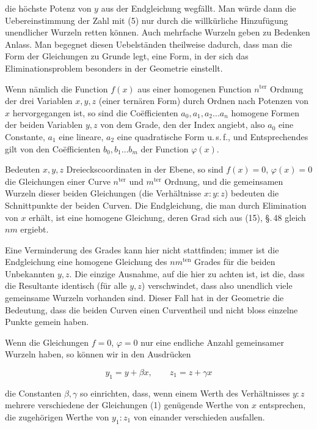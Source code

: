 die höchste Potenz von $y$ aus der Endgleichung wegfällt. Man
würde dann die Uebereinstimmung der Zahl mit (5) nur durch
die willkürliche Hinzufügung unendlicher Wurzeln retten können.
Auch mehrfache Wurzeln geben zu Bedenken Anlass. Man begegnet diesen Uebelständen theilweise dadurch, dass man die
 Form der Gleichungen zu Grunde legt, eine Form,
in der sich das Eliminationsproblem besonders in der Geometrie
einstellt.

Wenn nämlich die Function $f(x)$ aus einer homogenen
Function $n^{\mathrm{ter}}$ Ordnung der drei Variablen $x, y, z$ (einer ternären
Form) durch Ordnen nach Potenzen von $x$ hervorgegangen ist,
so sind die Co\"efficienten $a_0, a_1, a_2 \ldots a_n$ homogene Formen der
beiden Variablen $y, z$ von dem Grade, den der Index angiebt,
also $a_0$ eine Constante, $a_1$ eine lineare, $a_2$ eine quadratische
Form u.\,s.\,f., und Entsprechendes gilt von den Co\"efficienten
$b_0, b_1 \ldots b_m$ der Function $\varphi(x)$.

Bedeuten $x, y, z$ Dreieckscoordinaten in der Ebene, so sind
$f(x) = 0$, $\varphi(x) = 0$ die Gleichungen einer Curve $n^{\mathrm{ter}}$ und
$m^{\mathrm{ter}}$ Ordnung, und die gemeinsamen Wurzeln dieser beiden
Gleichungen (die Verhältnisse $x:y:z$) bedeuten die Schnittpunkte
der beiden Curven. Die Endgleichung, die man durch Elimination von $x$ erhält, ist eine homogene Gleichung, deren Grad
sich aus (15), \S.\,48 gleich $nm$ ergiebt.

Eine Verminderung des Grades kann hier nicht stattfinden;
immer ist die Endgleichung eine homogene Gleichung des $nm^{\mathrm{ten}}$
Grades für die beiden Unbekannten $y, z$. Die einzige Ausnahme,
auf die hier zu achten ist, ist die, dass die Resultante identisch
(für alle $y, z$) verschwindet, dass also unendlich viele gemeinsame Wurzeln vorhanden sind. Dieser Fall hat in der Geometrie
die Bedeutung, dass die beiden Curven einen Curventheil und
nicht bloss einzelne Punkte gemein haben.

Wenn die Gleichungen $f = 0$, $\varphi = 0$ nur eine endliche
Anzahl gemeinsamer Wurzeln haben, so können wir in den
Ausdrücken

\[
y_1 = y + \beta x, \qquad z_1 = z + \gamma x
\]

die Constanten $\beta, \gamma$ so einrichten, dass, wenn einem Werth des
Verhältnisses $y : z$ mehrere verschiedene der Gleichungen (1)
genügende Werthe von $x$ entsprechen, die zugehörigen Werthe
von $y_1 : z_1$ von einander verschieden ausfallen.

